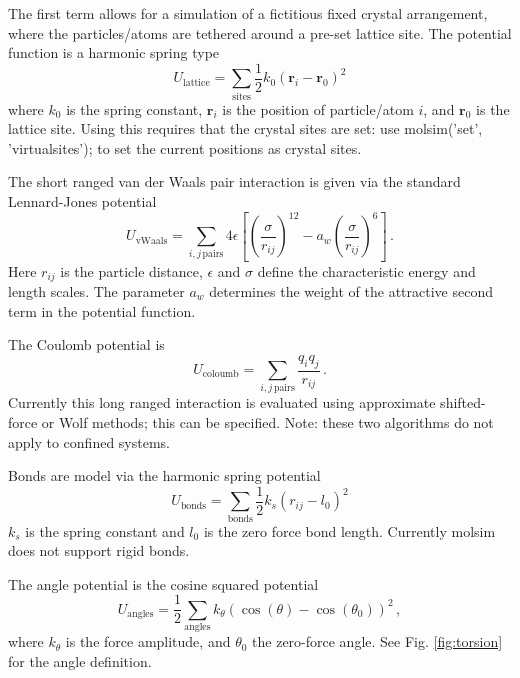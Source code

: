 \documentclass[11pt]{article}
\begin{document}
The first term allows for a simulation of a fictitious fixed crystal
arrangement, where the particles/atoms are tethered around a pre-set lattice
site. The potential function is a harmonic spring type
\begin{equation}
  U_\mathrm{lattice} =
  \sum_\mathrm{sites} \frac{1}{2}k_0 (\mathbf{r}_i - \mathbf{r}_0)^2
\end{equation}
where $k_0$ is the spring constant, $\mathbf{r}_i$ is the position of
particle/atom $i$, and $\mathbf{r}_0$ is the lattice site. Using this requires
that the crystal sites are set: use \textsf{molsim('set', 'virtualsites');} to
set the current positions as crystal sites. 

The short ranged van der Waals pair interaction is given via the standard
Lennard-Jones potential
\begin{equation}
  U_\mathrm{vWaals} =  \sum_{i,j \, \mathrm{pairs}}
  4\epsilon\left[\left(\frac{\sigma}{r_{ij}}\right)^{12} - a_w
    \left(\frac{\sigma}{r_{ij}}\right)^{6}\right] \, .
\end{equation}
Here $r_{ij}$ is the particle distance, $\epsilon$ and $\sigma$ define the
characteristic energy and length scales. The parameter $a_w$ determines the
weight of the attractive second term in the potential function.

The Coulomb potential is 
\begin{equation}
  U_{\mathrm{coloumb}} = \sum_{i,j \, \mathrm{pairs}}\frac{q_iq_j}{r_{ij}} \, .
\end{equation}
Currently this long ranged interaction is evaluated using approximate
shifted-force or Wolf methods; this can be specified. Note: these two
algorithms do not apply to confined systems.

Bonds are model via the harmonic spring potential
\begin{equation}
  U_{\mathrm{bonds}} =\sum_{\mathrm{bonds}} \frac{1}{2} k_{s}(r_{ij} - l_0)^2
\end{equation}
$k_s$ is the spring constant and $l_0$ is the zero force bond length. 
Currently \textsf{molsim} does not support rigid bonds. 

The angle potential is the cosine squared potential
\begin{equation}
  U_{\mathrm{angles}}=\frac{1}{2}\sum_{\mathrm{angles}} k_{\theta} (\cos(\theta) - \cos(\theta_0))^2 \, ,
\end{equation}
where $k_\theta$ is the force amplitude, and $\theta_0$ the zero-force
angle. See Fig. \ref{fig:torsion} for the angle definition.
\end{document}
